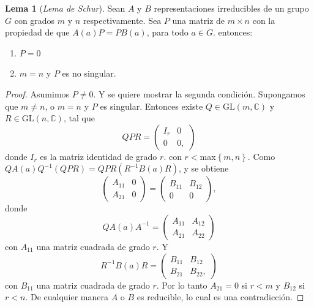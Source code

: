 \documentclass[12pt]{book}
\theoremstyle{definition}
\newtheorem{lemma}[theorem]{Lema}
\newcounter{in}
\begin{document}
\begin{lemma}[\textit{Lema de Schur}]
  \label{l3_1}
  Sean $A$ y $B$ representaciones
  irreducibles de un grupo $G$ con grados $m$ y $n$ respectivamente. Sea
  $P$ una matriz de $m \times n$ con la propiedad de que $A(a)P=PB(a)$, para
  todo $a \in G$.  entonces:
  \begin{enumerate}
  \item $P=0$
  \item $m=n$ y $P$ es no singular.
  \end{enumerate}
\end{lemma}

\begin{proof}
  Asumimos $P \neq 0$. Y se quiere mostrar la segunda
  condición. Supongamos que $m \neq n$, o $m=n$ y $P$ es
  singular. Entonces existe $Q \in \mathrm{GL}(m,\mathbb{C})$ y
  $R \in \mathrm{GL}(n,\mathbb{C})$, tal que
  \begin{equation}
    \label{eq:16}
    QPR=
    \begin{pmatrix}
      I_{r} & 0 \\ 
      0 & 0,
    \end{pmatrix} 
  \end{equation}
  donde $I_{r}$ es la matriz identidad de grado $r$. con
  $r<$max$\left\{ m,n \right\}$. Como
  $QA(a)Q^{-1}(QPR) = QPR(R^{-1}B(a)R)$, y se obtiene
  \begin{equation}
    \label{eq:17}
    \begin{pmatrix}
      A_{11} & 0 \\ 
      A_{21} & 0
    \end{pmatrix}
    =
    \begin{pmatrix}
      B_{11} & B_{12} \\ 
      0 & 0
    \end{pmatrix},
  \end{equation}
  donde
  \begin{equation}
    \label{eq:18}
    QA(a)A^{-1}=
    \begin{pmatrix}
      A_{11} & A_{12} \\ 
      A_{21} & A_{22}
    \end{pmatrix} 
  \end{equation}  
  con $A_{11}$ una matriz cuadrada de grado $r$. Y
  \begin{equation}
    \label{eq:19}
    R^{-1}B(a)R=
    \begin{pmatrix}
      B_{11} & B_{12} \\ 
      B_{21} & B_{22},
    \end{pmatrix}
  \end{equation}
  con $B_{11}$ una matriz cuadrada de grado $r$. Por lo tanto
  $A_{21}=0$ si $r<m$ y $B_{12}$ si $r<n$. De cualquier manera
  $A$ o $B$ es reducible, lo cual es una
  contradicción.
\end{proof}
\end{document}

